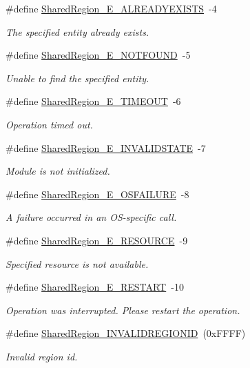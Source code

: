 \begin{DoxyCompactItemize}
\#define \hyperlink{_shared_region_8h_a7df199a0327c8ba88ca03f73f4119815}{SharedRegion\_\-E\_\-ALREADYEXISTS}~-\/4
\begin{DoxyCompactList}\small\item\em The specified entity already exists. \item\end{DoxyCompactList}\item 
\#define \hyperlink{_shared_region_8h_a6002cac7430e40aefe151274b1b3ec3b}{SharedRegion\_\-E\_\-NOTFOUND}~-\/5
\begin{DoxyCompactList}\small\item\em Unable to find the specified entity. \item\end{DoxyCompactList}\item 
\#define \hyperlink{_shared_region_8h_a030f39eb6a4dda552520aa2873bfd02b}{SharedRegion\_\-E\_\-TIMEOUT}~-\/6
\begin{DoxyCompactList}\small\item\em Operation timed out. \item\end{DoxyCompactList}\item 
\#define \hyperlink{_shared_region_8h_a66763317d6f51467f6c52c6adfc226ac}{SharedRegion\_\-E\_\-INVALIDSTATE}~-\/7
\begin{DoxyCompactList}\small\item\em Module is not initialized. \item\end{DoxyCompactList}\item 
\#define \hyperlink{_shared_region_8h_adb57012556121d43f887d1930e0b26ef}{SharedRegion\_\-E\_\-OSFAILURE}~-\/8
\begin{DoxyCompactList}\small\item\em A failure occurred in an OS-\/specific call. \item\end{DoxyCompactList}\item 
\#define \hyperlink{_shared_region_8h_aae63a683d1705eed55bb537a55b4bb20}{SharedRegion\_\-E\_\-RESOURCE}~-\/9
\begin{DoxyCompactList}\small\item\em Specified resource is not available. \item\end{DoxyCompactList}\item 
\#define \hyperlink{_shared_region_8h_a55086f20c7279ee538a1325fe5a60b9d}{SharedRegion\_\-E\_\-RESTART}~-\/10
\begin{DoxyCompactList}\small\item\em Operation was interrupted. Please restart the operation. \item\end{DoxyCompactList}\item 
\#define \hyperlink{_shared_region_8h_a8212f0ca02e94eb45edad350147db529}{SharedRegion\_\-INVALIDREGIONID}~(0xFFFF)
\begin{DoxyCompactList}\small\item\em Invalid region id. \item\end{DoxyCompactList}\end{DoxyCompactItemize}
